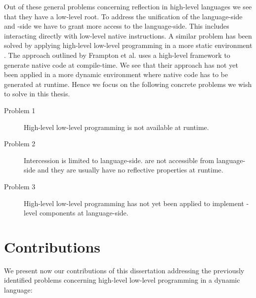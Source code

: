 \noindent Out of these general problems concerning reflection in high-level languages we see that they have a low-level root.
To address the unification of the language-side and \VM-side we have to grant more access to the language-side.
This includes interacting directly with low-level native instructions.
A similar problem has been solved by applying high-level low-level programming in a more static environment \cite{Fram09a}.
The approach outlined by Frampton et al. uses a high-level framework to generate native code at compile-time.
We see that their approach has not yet been applied in a more dynamic environment where native code has to be generated at runtime.
Hence we focus on the following concrete problems we wish to solve in this thesis.

\begin{description}
	\item[Problem 1] High-level low-level programming is not available at runtime.
	
	\item[Problem 2] Intercession is limited to language-side.
	\VMs are not accessible from language-side and they are usually have no reflective properties at runtime.
	
	\item[Problem 3] High-level low-level programming has not yet been applied to implement \VM-level components at language-side.
\end{description}


\section{Contributions}

We present now our contributions of this dissertation addressing the previously identified problems concerning high-level low-level programming in a dynamic language:


